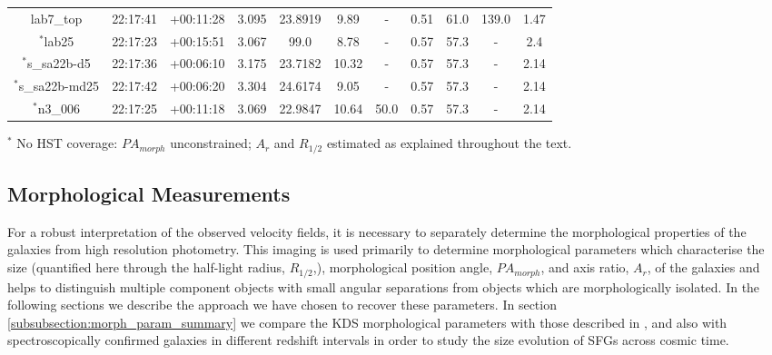 \documentclass[fleqn,usenatbib]{mn2e}
\begin{document}
\begin{table*}
\begin{threeparttable}
\begin{tabular}{ccccccccccc}
lab7\_top     & 22:17:41 & +00:11:28 & 3.095      & 23.8919 & 9.89  & -            & 0.51        & 61.0        & 139.0   & 1.47 \\
$^{*}$lab25         & 22:17:23 & +00:15:51 & 3.067      & 99.0    & 8.78  & -            & 0.57         & 57.3        & -    & 2.4      \\
$^{*}$s\_sa22b-d5  & 22:17:36 & +00:06:10 & 3.175 & 23.7182 & 10.32 & -            & 0.57         & 57.3        & -    & 2.14      \\
$^{*}$s\_sa22b-md25 & 22:17:42 & +00:06:20 & 3.304     & 24.6174 & 9.05  & -            & 0.57         & 57.3        & -    & 2.14      \\
$^{*}$n3\_006       & 22:17:25 & +00:11:18 & 3.069     & 22.9847 & 10.64 & 50.0 & 0.57         & 57.3        & -    & 2.14      

\end{tabular}
\begin{tablenotes}
      \small
      \item $^{*}$ No HST coverage: $PA_{morph}$ unconstrained; $A_{r}$ and $R_{1/2}$ estimated as explained throughout the text.
    \end{tablenotes}
  \end{threeparttable}
  \end{table*}


\subsection{Morphological Measurements}
For a robust interpretation of the observed velocity fields, it is necessary to separately determine the morphological properties of the galaxies from high resolution photometry.
This imaging is used primarily to determine morphological parameters which characterise the size (quantified here through the half-light radius, $R_{1/2}$,), morphological position angle, $PA_{morph}$, and axis ratio, $A_{r}$, of the galaxies and helps to distinguish multiple component objects with small angular separations from objects which are morphologically isolated.
In the following sections we describe the approach we have chosen to recover these parameters.
In section \cref{subsubsection:morph_param_summary} we compare the KDS morphological parameters with those described in \cite{VanderWel2012}, and also with spectroscopically confirmed galaxies in different redshift intervals in order to study the size evolution of SFGs across cosmic time.
\end{document}
